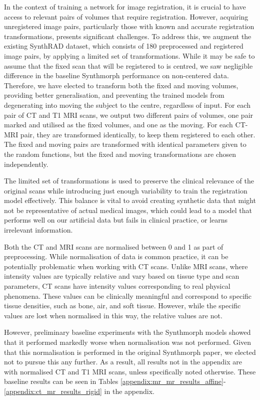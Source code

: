 In the context of training a network for image registration, it is crucial to have access to relevant pairs of volumes that require registration. However, acquiring unregistered image pairs, particularly those with known and accurate registration transformations, presents significant challenges. To address this, we augment the existing SynthRAD dataset, which consists of 180 preprocessed and registered image pairs, by applying a limited set of transformations. While it may be safe to assume that the fixed scan that will be registered to is centred, we saw negligible difference in the baseline Synthmorph performance on non-centered data. Therefore, we have elected to transform both the fixed and moving volumes, providing better generalisation, and preventing the trained models from degenerating into moving the subject to the centre, regardless of input. For each pair of CT and T1 MRI scans, we output two different pairs of volumes, one pair marked and utilised as the fixed volumes, and one as the moving. For each CT-MRI pair, they are transformed identically, to keep them registered to each other. The fixed and moving pairs are transformed with identical parameters given to the random functions, but the fixed and moving transformations are chosen independently.

The limited set of transformations is used to preserve the clinical relevance of the original scans while introducing just enough variability to train the registration model effectively. This balance is vital to avoid creating synthetic data that might not be representative of actual medical images, which could lead to a model that performs well on our artificial data but fails in clinical practice, or learns irrelevant information.

Both the CT and MRI scans are normalised between 0 and 1 as part of preprocessing. While normalisation of data is common practice, it can be potentially problematic when working with CT scans. Unlike MRI scans, where intensity values are typically relative and vary based on tissue type and scan parameters, CT scans have intensity values corresponding to real physical phenomena. These values can be clinically meaningful and correspond to specific tissue densities, such as bone, air, and soft tissue. However, while the specific values are lost when normalised in this way, the relative values are not.

However, preliminary baseline experiments with the Synthmorph models showed that it performed markedly worse when normalisation was not performed. Given that this normalisation is performed in the original Synthmorph paper\cite{synthmorph}, we elected not to pursue this any further. As a result, all results not in the appendix are with normalised CT and T1 MRI scans, unless specifically noted otherwise. These baseline results can be seen in Tables \ref{appendix:mr_mr_results_affine}-\ref{appendix:ct_mr_results_rigid} in the appendix.

